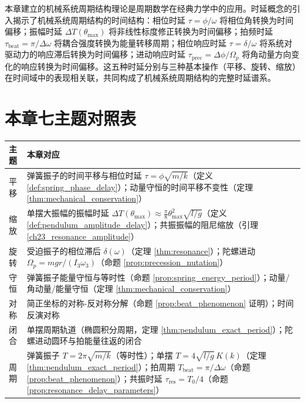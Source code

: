 \begin{remark}[与全书的衔接]
本章建立的机械系统周期结构理论是周期数学在经典力学中的应用。时延概念的引入揭示了机械系统周期结构的时间结构：相位时延 $\tau = \phi/\omega$ 将相位角转换为时间偏移；振幅时延 $\Delta T(\theta_{\max})$ 将非线性标度修正转换为时间偏移；拍频时延 $\tau_{\text{beat}} = \pi/\Delta\omega$ 将耦合强度转换为能量转移周期；相位响应时延 $\tau = \delta/\omega$ 将系统对驱动力的响应滞后转换为时间偏移；进动响应时延 $\tau_{\text{prec}} = \Delta\phi/\Omega_p$ 将角动量方向变化的响应转换为时间偏移。这五种时延分别与三种基本操作（平移、旋转、缩放）在时间域中的表现相关联，共同构成了机械系统周期结构的完整时延谱系。
\end{remark}

\section*{本章七主题对照表}

\begin{center}
\begin{tabular}{>{\centering\arraybackslash}p{2.2cm}>{\centering\arraybackslash}p{10.5cm}}
\toprule
主题 & 本章对应 \\
\midrule
平移 & 弹簧振子的时间平移与相位时延 $\tau = \phi\sqrt{m/k}$（定义 \ref{def:spring_phase_delay}）；动量守恒的时间平移不变性（定理 \ref{thm:mechanical_conservation}） \\
缩放 & 单摆大振幅的振幅时延 $\Delta T(\theta_{\max}) \approx \frac{\pi}{8}\theta_{\max}^2\sqrt{l/g}$（定义 \ref{def:pendulum_amplitude_delay}）；共振振幅的阻尼缩放（引理 \ref{ch23_resonance_amplitude}） \\
旋转 & 受迫振子的相位滞后 $\delta(\omega)$（定理 \ref{thm:resonance}）；陀螺进动 $\Omega_p = mgr/(I_3\omega_3)$（命题 \ref{prop:precession_nutation}） \\
守恒 & 弹簧振子能量守恒与等时性（命题 \ref{prop:spring_energy_period}）；动量/角动量/能量守恒（定理 \ref{thm:mechanical_conservation}） \\
对称 & 简正坐标的对称-反对称分解（命题 \ref{prop:beat_phenomenon} 证明）；时间反演对称 \\
闭合 & 单摆周期轨道（椭圆积分周期，定理 \ref{thm:pendulum_exact_period}）；陀螺进动圆环与拍能量往返的闭合 \\
周期 & 弹簧振子 $T = 2\pi\sqrt{m/k}$（等时性）；单摆 $T = 4\sqrt{l/g}\,K(k)$（定理 \ref{thm:pendulum_exact_period}）；拍周期 $T_{\text{beat}} = \pi/\Delta\omega$（命题 \ref{prop:beat_phenomenon}）；共振时延 $\tau_{\text{res}} = T_0/4$（命题 \ref{prop:resonance_delay_parameters}） \\
\bottomrule
\end{tabular}
\end{center}

